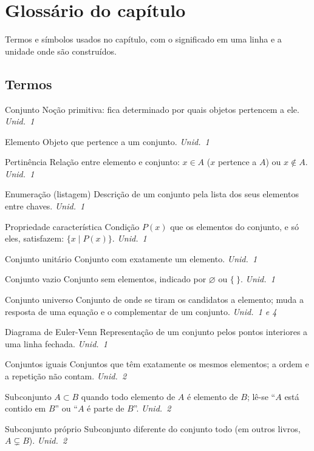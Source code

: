 \section*{Glossário do capítulo}
{\small Termos e símbolos usados no capítulo, com o significado em uma linha e a unidade onde são construídos.}

\subsection*{Termos}
\begin{glossario}
\item[Conjunto] Noção primitiva: fica determinado por quais objetos pertencem a ele. \hfill\emph{Unid.~1}
\item[Elemento] Objeto que pertence a um conjunto. \hfill\emph{Unid.~1}
\item[Pertinência] Relação entre elemento e conjunto: $x\in A$ ($x$ pertence a $A$) ou $x\notin A$. \hfill\emph{Unid.~1}
\item[Enumeração (listagem)] Descrição de um conjunto pela lista dos seus elementos entre chaves. \hfill\emph{Unid.~1}
\item[Propriedade característica] Condição $P(x)$ que os elementos do conjunto, e só eles, satisfazem: $\{x\mid P(x)\}$. \hfill\emph{Unid.~1}
\item[Conjunto unitário] Conjunto com exatamente um elemento. \hfill\emph{Unid.~1}
\item[Conjunto vazio] Conjunto sem elementos, indicado por $\varnothing$ ou $\{\ \}$. \hfill\emph{Unid.~1}
\item[Conjunto universo] Conjunto de onde se tiram os candidatos a elemento; muda a resposta de uma equação e o complementar de um conjunto. \hfill\emph{Unid.~1 e 4}
\item[Diagrama de Euler-Venn] Representação de um conjunto pelos pontos interiores a uma linha fechada. \hfill\emph{Unid.~1}
\item[Conjuntos iguais] Conjuntos que têm exatamente os mesmos elementos; a ordem e a repetição não contam. \hfill\emph{Unid.~2}
\item[Subconjunto] $A\subset B$ quando todo elemento de $A$ é elemento de $B$; lê-se \enquote{$A$ está contido em $B$} ou \enquote{$A$ é parte de $B$}. \hfill\emph{Unid.~2}
\item[Subconjunto próprio] Subconjunto diferente do conjunto todo (em outros livros, $A\subsetneq B$). \hfill\emph{Unid.~2}

\end{glossario}
